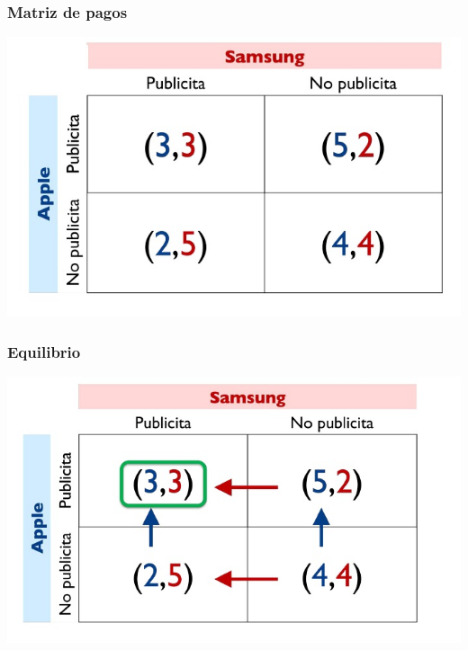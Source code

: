 \documentclass{beamer}
\begin{document}
\begin{frame}
\frametitle{ Matriz de pagos}
\centering
\includegraphics[scale=0.6]{Figures/Tema_03_20_bala.jpg}
\end{frame}

\begin{frame}
\frametitle{ Equilibrio}
\centering
\includegraphics[scale=0.6]{Figures/Tema_03_21_bala.jpg}
\end{frame}
\end{document}
